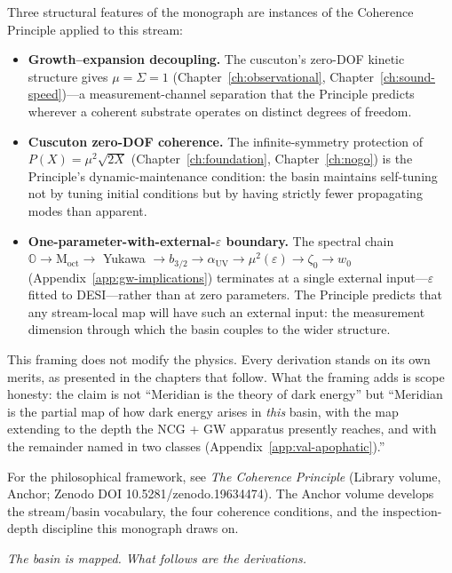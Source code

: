 Three structural features of the monograph are instances of the
Coherence Principle applied to this stream:
\begin{itemize}\setlength{\itemsep}{2pt}
  \item \textbf{Growth--expansion decoupling.} The cuscuton's
  zero-DOF kinetic structure gives $\mu = \Sigma = 1$
  (Chapter~\ref{ch:observational}, Chapter~\ref{ch:sound-speed})---a
  measurement-channel separation that the Principle predicts
  wherever a coherent substrate operates on distinct degrees of
  freedom.
  \item \textbf{Cuscuton zero-DOF coherence.} The infinite-symmetry
  protection of $P(X) = \mu^2\sqrt{2X}$
  (Chapter~\ref{ch:foundation}, Chapter~\ref{ch:nogo}) is the
  Principle's dynamic-maintenance condition: the basin maintains
  self-tuning not by tuning initial conditions but by having
  strictly fewer propagating modes than apparent.
  \item \textbf{One-parameter-with-external-$\varepsilon$ boundary.}
  The spectral chain $\mathbb{O} \to \mathrm{M}_\mathrm{oct} \to$
  Yukawa $\to b_{3/2} \to \alpha_\mathrm{UV} \to \mu^2(\varepsilon)
  \to \zeta_0 \to w_0$ (Appendix~\ref{app:gw-implications})
  terminates at a single external input---$\varepsilon$ fitted to
  DESI---rather than at zero parameters. The Principle predicts that
  any stream-local map will have such an external input: the
  measurement dimension through which the basin couples to the
  wider structure.
\end{itemize}

This framing does not modify the physics. Every derivation stands on
its own merits, as presented in the chapters that follow. What the
framing adds is scope honesty: the claim is not ``Meridian is the
theory of dark energy'' but ``Meridian is the partial map of how
dark energy arises in \emph{this} basin, with the map extending to
the depth the NCG + GW apparatus presently reaches, and with the
remainder named in two classes
(Appendix~\ref{app:val-apophatic}).''

For the philosophical framework, see
\emph{The Coherence Principle} (Library volume, Anchor;
Zenodo DOI 10.5281/zenodo.19634474). The Anchor volume develops the
stream/basin vocabulary, the four coherence conditions, and the
inspection-depth discipline this monograph draws on.

\bigskip
\begin{center}
\itshape The basin is mapped. What follows are the derivations.
\end{center}

